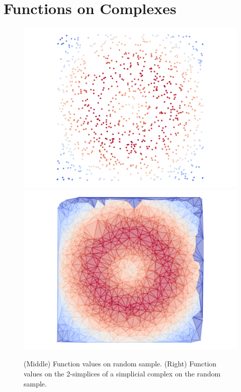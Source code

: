 \section{Functions on Complexes} %
\label{sec:functions}

\begin{figure}[htbp]
\centering
    \includegraphics[scale=0.36]{figures/fsample.pdf}
    \includegraphics[scale=0.36]{figures/fcomplex.pdf}
     \caption{%
        (Middle) Function values on random sample.
        (Right) Function values on the 2-simplices of a simplicial complex on the random sample.}
     \label{fig:function}
 \end{figure}

